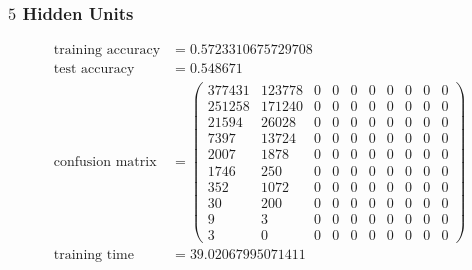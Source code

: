 \documentclass[11pt]{article}
\begin{document}
\subsubsection{$5$ Hidden Units}
\begin{equation}
  \begin{split}
    \text{training accuracy} &= 0.5723310675729708\\
    \text{test accuracy} &= 0.548671\\
    \text{confusion matrix} &=
    \begin{pmatrix}
      377431 & 123778 & 0 & 0 & 0 & 0 & 0 & 0 & 0 & 0 \\
      251258 & 171240 & 0 & 0 & 0 & 0 & 0 & 0 & 0 & 0 \\
      21594  & 26028  & 0 & 0 & 0 & 0 & 0 & 0 & 0 & 0 \\
      7397   & 13724  & 0 & 0 & 0 & 0 & 0 & 0 & 0 & 0 \\
      2007   & 1878   & 0 & 0 & 0 & 0 & 0 & 0 & 0 & 0 \\
      1746   & 250    & 0 & 0 & 0 & 0 & 0 & 0 & 0 & 0 \\
      352    & 1072   & 0 & 0 & 0 & 0 & 0 & 0 & 0 & 0 \\
      30     & 200    & 0 & 0 & 0 & 0 & 0 & 0 & 0 & 0 \\
      9      & 3      & 0 & 0 & 0 & 0 & 0 & 0 & 0 & 0 \\
      3      & 0      & 0 & 0 & 0 & 0 & 0 & 0 & 0 & 0
    \end{pmatrix}\\
    \text{training time} &= 39.02067995071411
  \end{split}
\end{equation}
\end{document}
